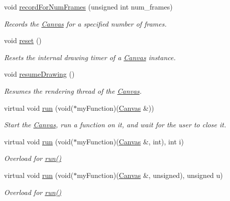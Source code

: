 \begin{DoxyCompactItemize}
void \hyperlink{classtsgl_1_1_canvas_a47436daa39473ddb4044bac7b3b27151}{record\-For\-Num\-Frames} (unsigned int num\-\_\-frames)
\begin{DoxyCompactList}\small\item\em \-Records the \hyperlink{classtsgl_1_1_canvas}{\-Canvas} for a specified number of frames. \end{DoxyCompactList}\item 
void \hyperlink{classtsgl_1_1_canvas_ada6403439b583910d27e497148da5f2e}{reset} ()
\begin{DoxyCompactList}\small\item\em \-Resets the internal drawing timer of a \hyperlink{classtsgl_1_1_canvas}{\-Canvas} instance. \end{DoxyCompactList}\item 
void \hyperlink{classtsgl_1_1_canvas_a56bf3c6e4eb7b06015d1c115aaa143f8}{resume\-Drawing} ()
\begin{DoxyCompactList}\small\item\em \-Resumes the rendering thread of the \hyperlink{classtsgl_1_1_canvas}{\-Canvas}. \end{DoxyCompactList}\item 
virtual void \hyperlink{classtsgl_1_1_canvas_a5f3f00d6c380a662a239077456045502}{run} (void($\ast$my\-Function)(\hyperlink{classtsgl_1_1_canvas}{\-Canvas} \&))
\begin{DoxyCompactList}\small\item\em \-Start the \hyperlink{classtsgl_1_1_canvas}{\-Canvas}, run a function on it, and wait for the user to close it. \end{DoxyCompactList}\item 
virtual void \hyperlink{classtsgl_1_1_canvas_a62ec8be88bea1905cdb6855138ef3cb1}{run} (void($\ast$my\-Function)(\hyperlink{classtsgl_1_1_canvas}{\-Canvas} \&, int), int i)
\begin{DoxyCompactList}\small\item\em \-Overload for \hyperlink{classtsgl_1_1_canvas_a5f3f00d6c380a662a239077456045502}{run()} \end{DoxyCompactList}\item 
virtual void \hyperlink{classtsgl_1_1_canvas_a67b341ead1fde0a692281d2b1f67be1e}{run} (void($\ast$my\-Function)(\hyperlink{classtsgl_1_1_canvas}{\-Canvas} \&, unsigned), unsigned u)
\begin{DoxyCompactList}\small\item\em \-Overload for \hyperlink{classtsgl_1_1_canvas_a5f3f00d6c380a662a239077456045502}{run()} \end{DoxyCompactList}\item 

\end{DoxyCompactItemize}
